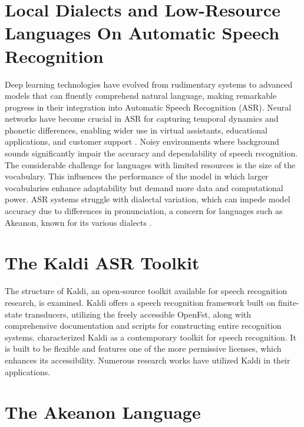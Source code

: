\section{Local Dialects and Low-Resource Languages On Automatic Speech Recognition}
\label{sec:LocalDialects}
Deep learning technologies have evolved from rudimentary systems to advanced models that can fluently comprehend natural language, making remarkable progress in their integration into Automatic Speech Recognition (ASR). Neural networks have become crucial in ASR for capturing temporal dynamics and phonetic differences, enabling wider use in virtual assistants, educational applications, and customer support . Noisy environments where background sounds significantly impair the accuracy and dependability of speech recognition. The considerable challenge for languages with limited resources is the size of the vocabulary. This influences the performance of the model in which larger vocabularies enhance adaptability but demand more data and computational power. ASR systems struggle with dialectal variation, which can impede model accuracy due to differences in pronunciation, a concern for languages such as Akeanon, known for its various dialects . 

\section{The Kaldi ASR Toolkit}
\label{sec: KALDI}
The structure of Kaldi, an open-source toolkit available for speech recognition research, is examined. Kaldi offers a speech recognition framework built on finite-state transducers, utilizing the freely accessible OpenFst, along with comprehensive documentation and scripts for constructing entire recognition systems.
 characterized Kaldi as a contemporary toolkit for speech recognition. It is built to be flexible and features one of the more permissive licenses, which enhances its accessibility. Numerous research works have utilized Kaldi in their applications.


\section{The Akeanon Language}
\label{sec:AkeanonLanguage}
